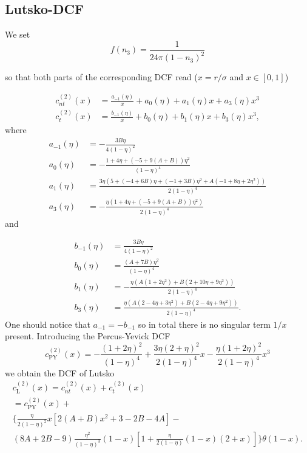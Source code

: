\documentclass{article}
\begin{document}
\subsection{Lutsko-DCF}

We set 
\begin{equation}
	f(n_3) = \frac{1}{24\pi(1-n_3)^2}
\end{equation}

so that both parts of the corresponding DCF read ($x=r/\sigma$ and $x\in[0,1]$)

\begin{align}
	c^{(2)}_{nt}(x) &= \frac{a_{-1}(\eta)}{x} + a_0(\eta) + a_1(\eta)x + a_3(\eta)x^3\\\nonumber
	c^{(2)}_{t}(x) &= \frac{b_{-1}(\eta)}{x} + b_0(\eta) + b_1(\eta)x + b_3(\eta)x^3,
\end{align}
where
\begin{align}
	a_{-1}(\eta) &= -\frac{3B\eta}{4(1-\eta)^2}\\\nonumber
	a_0(\eta) &= -\frac{1+4\eta+(-5+9(A+B))\eta^2}{(1-\eta)^4}\\\nonumber
	a_1(\eta) &= \frac{3\eta(5+(-4+6B)\eta+(-1+3B)\eta^2+A(-1+8\eta+2\eta^2))}{2(1-\eta)^4}\\\nonumber
	a_3(\eta) &= -\frac{\eta(1+4\eta+(-5+9(A+B))\eta^2)}{2(1-\eta)^4}
\end{align}
and

\begin{align}
	b_{-1}(\eta) &= \frac{3B\eta}{4(1-\eta)^2}\\\nonumber
	b_0(\eta) &= \frac{(A+7B)\eta^2}{(1-\eta)^4}\\\nonumber
	b_1(\eta) &= -\frac{\eta(A(1+2\eta^2)+B(2+10\eta+9\eta^2))}{2(1-\eta)^4}\\\nonumber
	b_3(\eta) &= \frac{\eta(A(2-4\eta+3\eta^2)+B(2-4\eta+9\eta^2))}{2(1-\eta)^4}.
\end{align}
One should notice that $a_{-1} = -b_{-1}$ so in total there is no singular term $1/x$ present. Introducing the Percus-Yevick DCF 
\begin{equation}
	c^{(2)}_{\text{PY}}(x) = -\frac{(1+2\eta)^2}{(1-\eta)^4} + \frac{3\eta(2+\eta)^2}{2(1-\eta)^4}x-\frac{\eta(1+2\eta)^2}{2(1-\eta)^4}x^3
\end{equation}
we obtain the DCF of Lutsko
\begin{gather}
	c^{(2)}_{\text{L}}(x) = c^{(2)}_{nt}(x)+c^{(2)}_{t}(x)\\\nonumber
	= c^{(2)}_{\text{PY}}(x) + \\\{\frac{\eta}{2(1-\eta)^2}x\left[2(A+B)x^2+3-2B-4A\right]-\\\nonumber
	(8A+2B-9)\frac{\eta^2}{(1-\eta)^3}(1-x)\left[1+\frac{\eta}{2(1-\eta)}(1-x)(2+x)\right]\}\theta(1-x).
\end{gather}
\end{document}
